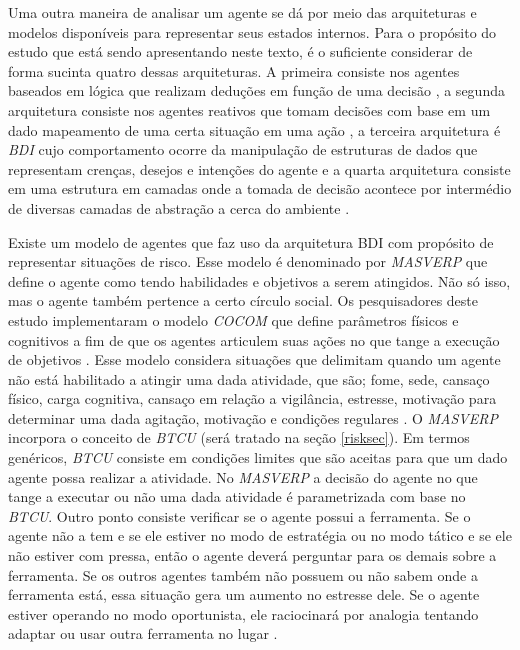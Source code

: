 Uma outra maneira de analisar um agente se dá por meio das arquiteturas e modelos disponíveis para representar seus estados internos. Para o propósito do estudo que está sendo apresentando neste texto, é o suficiente considerar de forma sucinta quatro dessas arquiteturas. A primeira consiste nos agentes baseados em lógica que realizam deduções em função de uma decisão \cite{logicagent}, a segunda arquitetura consiste nos agentes reativos que tomam decisões com base em um dado mapeamento de uma certa situação em uma  ação \cite{reactiveagent}, a terceira arquitetura é \textit{BDI} cujo comportamento ocorre da manipulação de estruturas de dados que representam crenças, desejos e intenções do agente \cite{bdi} e a quarta arquitetura consiste em uma estrutura em camadas onde a tomada de decisão acontece por intermédio de diversas camadas de abstração a cerca do ambiente \cite{layeragent} \cite{whatisagent}.  

Existe um modelo de agentes que faz uso da arquitetura BDI com propósito de representar situações de risco. Esse modelo é denominado por \textit{MASVERP} que define o agente como tendo habilidades e objetivos a serem atingidos. Não só isso, mas o agente também pertence a certo círculo social. Os pesquisadores deste estudo implementaram o modelo \textit{COCOM} que define parâmetros físicos e cognitivos a fim de que os agentes articulem suas ações no que tange a execução de objetivos \cite{mavesp}. Esse modelo considera situações que delimitam quando um agente não está habilitado a atingir uma dada atividade, que são; fome, sede, cansaço físico, carga cognitiva, cansaço em relação a vigilância, estresse, motivação para determinar uma dada agitação, motivação e condições regulares \cite{mavesp}. O \textit{MASVERP} incorpora o conceito de \textit{BTCU} (será tratado na seção \ref{risksec}). Em termos genéricos, \textit{BTCU} consiste em condições limites que são aceitas para que um dado agente possa realizar a atividade. No \textit{MASVERP} a decisão do agente no que tange a executar ou não uma dada atividade é parametrizada com base no \textit{BTCU}. Outro ponto consiste verificar se o agente possui a ferramenta. Se o agente não a tem e se ele estiver no modo de estratégia ou no modo tático e se ele não estiver com pressa, então o agente deverá perguntar para os demais sobre a ferramenta. Se os outros agentes também não possuem ou não sabem onde a ferramenta está, essa situação gera um aumento no estresse dele. Se o agente estiver operando no modo oportunista, ele raciocinará por analogia tentando adaptar ou usar outra ferramenta no lugar \cite{mavesp}. 